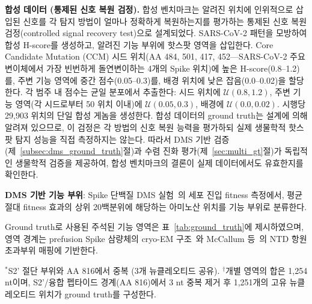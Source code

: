\textbf{합성 데이터 (통제된 신호 복원 검정).}
합성 벤치마크는 알려진 위치에 인위적으로 삽입된 신호를 각 탐지 방법이 얼마나 정확하게 복원하는지를 평가하는 통제된 신호 복원 검정(controlled signal recovery test)으로 설계되었다.
SARS-CoV-2 패턴을 모방하여 합성 H-score를 생성하고, 알려진 기능 부위에 핫스팟 영역을 삽입한다.
Core Candidate Mutation (CCM) 시드 위치(AA 484, 501, 417, 452---SARS-CoV-2 주요 변이체에서 가장 빈번하게 돌연변이하는 4개의 Spike 위치)에 높은 H-score(0.8--1.2)를, 주변 기능 영역에 중간 점수(0.05--0.3)를, 배경 위치에 낮은 잡음(0.0--0.02)을 할당한다.
각 범주 내 점수는 균일 분포에서 추출한다: 시드 위치에 $\mathcal{U}(0.8, 1.2)$, 주변 기능 영역(각 시드로부터 50 위치 이내)에 $\mathcal{U}(0.05, 0.3)$, 배경에 $\mathcal{U}(0.0, 0.02)$. 시행당 29,903 위치의 단일 합성 게놈을 생성한다.
합성 데이터의 ground truth는 설계에 의해 알려져 있으므로, 이 검정은 각 방법의 신호 복원 능력을 평가하되 실제 생물학적 핫스팟 탐지 성능을 직접 측정하지는 않는다.
따라서 DMS 기반 검증(제~\ref{subsec:dms_ground_truth}절)과 수렴 진화 평가(제~\ref{sec:multi_gt}절)가 독립적인 생물학적 검증을 제공하여, 합성 벤치마크의 결론이 실제 데이터에서도 유효한지를 확인한다.

\textbf{DMS 기반 기능 부위}: Spike 단백질 DMS 실험~\cite{dadonaite2023dms}의 세포 진입 fitness 측정에서, 평균 절대 fitness 효과의 상위 20백분위에 해당하는 아미노산 위치를 기능 부위로 분류한다.

Ground truth로 사용된 주석된 기능 영역은 표~\ref{tab:ground_truth}에 제시하였으며, 영역 경계는 prefusion Spike 삼량체의 cryo-EM 구조~\cite{wrapp2020cryo}와 McCallum 등~\cite{mccallum2021ntd}의 NTD 항원 초과부위 매핑에 기반한다.

\begin{table}[htbp]
\centering
\caption{Spike 단백질의 기능 영역 (ground truth)}
\label{tab:ground_truth}
\begin{minipage}{\textwidth}
\smallskip
\footnotesize $^*$S2' 절단 부위와 AA 816에서 중복 (3개 뉴클레오티드 공유).
$^\dagger$개별 영역의 합은 1,254 nt이며, S2'/융합 펩타이드 경계(AA 816)에서 3 nt 중복 제거 후 1,251개의 고유 뉴클레오티드 위치가 ground truth를 구성한다.
\end{minipage}
\end{table}

